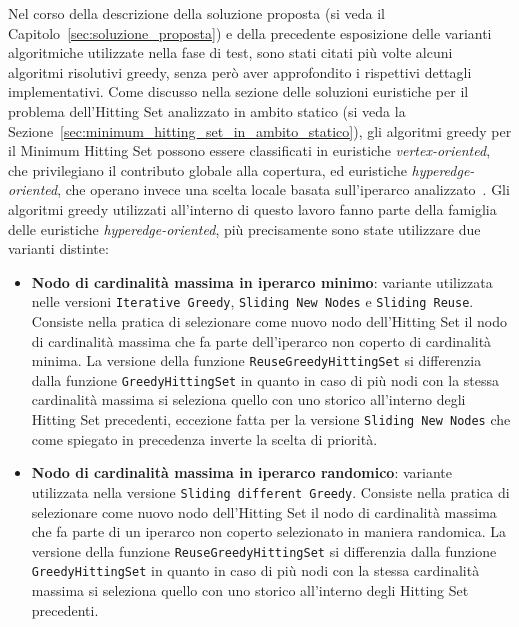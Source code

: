 Nel corso della descrizione della soluzione proposta (si veda il Capitolo~\ref{sec:soluzione_proposta}) e della precedente esposizione delle varianti algoritmiche utilizzate nella fase di test, sono stati citati più volte alcuni algoritmi risolutivi greedy, senza però aver approfondito i rispettivi dettagli implementativi.
Come discusso nella sezione delle soluzioni euristiche per il problema dell'Hitting Set analizzato in ambito statico (si veda la Sezione~\ref{sec:minimum_hitting_set_in_ambito_statico}), gli algoritmi greedy per il Minimum Hitting Set possono essere classificati in euristiche \emph{vertex-oriented}, che privilegiano il contributo globale alla copertura, ed euristiche \emph{hyperedge-oriented}, che operano invece una scelta locale basata sull'iperarco analizzato~\cite{gainer2017}.
Gli algoritmi greedy utilizzati all'interno di questo lavoro fanno parte della famiglia delle euristiche \emph{hyperedge-oriented}, più precisamente sono state utilizzare due varianti distinte:
\begin{itemize}
    \item \textbf{Nodo di cardinalità massima in iperarco minimo}: variante utilizzata nelle versioni \texttt{Iterative Greedy}, \texttt{Sliding New Nodes} e \texttt{Sliding Reuse}.
    Consiste nella pratica di selezionare come nuovo nodo dell'Hitting Set il nodo di cardinalità massima che fa parte dell'iperarco non coperto di cardinalità minima.
    La versione della funzione \texttt{ReuseGreedyHittingSet} si differenzia dalla funzione \texttt{GreedyHittingSet} in quanto in caso di più nodi con la stessa cardinalità massima si seleziona quello con uno storico all'interno degli Hitting Set precedenti, eccezione fatta per la versione \texttt{Sliding New Nodes} che come spiegato in precedenza inverte la scelta di priorità.
    \item \textbf{Nodo di cardinalità massima in iperarco randomico}: variante utilizzata nella versione \texttt{Sliding different Greedy}.
    Consiste nella pratica di selezionare come nuovo nodo dell'Hitting Set il nodo di cardinalità massima che fa parte di un iperarco non coperto selezionato in maniera randomica.
    La versione della funzione \texttt{ReuseGreedyHittingSet} si differenzia dalla funzione \texttt{GreedyHittingSet} in quanto in caso di più nodi con la stessa cardinalità massima si seleziona quello con uno storico all'interno degli Hitting Set precedenti.
\end{itemize}